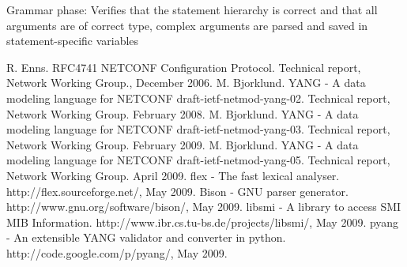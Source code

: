 \documentclass[conference]{IEEEtran}
\begin{document}
Grammar phase:
Verifies that the statement hierarchy is correct and that all arguments are of correct type, complex arguments are parsed and saved in statement-specific variables


\begin{thebibliography}{1}
 R. Enns. RFC4741 NETCONF Configuration Protocol. Technical report, Network Working Group.,
December 2006.
 M. Bjorklund. YANG - A data modeling language for NETCONF draft-ietf-netmod-yang-02. Technical report, Network Working Group. February 2008.
 M. Bjorklund. YANG - A data modeling language for NETCONF draft-ietf-netmod-yang-03. Technical report, Network Working Group. February 2009.
 M. Bjorklund. YANG - A data modeling language for NETCONF draft-ietf-netmod-yang-05. Technical report, Network Working Group. April 2009.
 flex - The fast lexical analyser. http://flex.sourceforge.net/, May 2009.
 Bison - GNU parser generator. http://www.gnu.org/software/bison/, May 2009.
 libsmi - A library to access SMI MIB Information. http://www.ibr.cs.tu-bs.de/projects/libsmi/, May 2009.
 pyang - An extensible YANG validator and converter in python. http://code.google.com/p/pyang/, May 2009.

\end{thebibliography}
\end{document}
